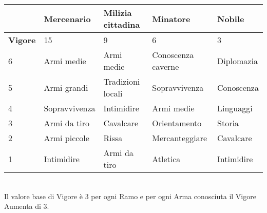 \documentclass[12pt,a4paper,twoside,openany]{book}
\begin{document}
\begin{tabular}{|l|l|l|l|l|}
&\textbf{Mercenario}&\textbf{Milizia cittadina}&\textbf{Minatore}&\textbf{Nobile}\\\hline
\textbf{Vigore}&15&9&6&3\\\hline		
6&Armi medie		&Armi medie		&Conoscenza	caverne	&Diplomazia\\
5&Armi grandi	&Tradizioni locali&Sopravvivenza	&Conoscenza\\
4&Sopravvivenza		&Intimidire		&Armi medie			&Linguaggi\\
3&Armi da tiro		&Cavalcare		&Orientamento		&Storia\\
2&Armi piccole		&Rissa			&Mercanteggiare		&Cavalcare\\
1&Intimidire		&Armi da tiro	&Atletica			&Intimidire\\\hline
							
\end{tabular}	\\

Il valore base di Vigore è 3 per ogni Ramo e per ogni Arma conosciuta il Vigore Aumenta di 3.
\end{document}
